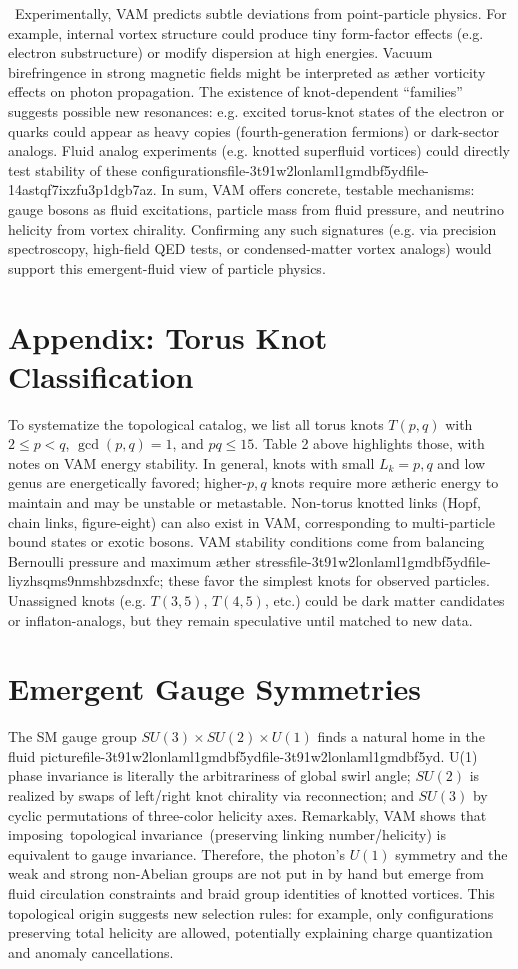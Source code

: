 \documentclass[a4paper,12pt]{article}
\begin{document}
 Experimentally, VAM predicts subtle deviations from point-particle physics. For example, internal vortex structure could produce tiny form-factor effects (e.g. electron substructure) or modify dispersion at high energies. Vacuum birefringence in strong magnetic fields might be interpreted as æther vorticity effects on photon propagation. The existence of knot-dependent “families” suggests possible new resonances: e.g. excited torus-knot states of the electron or quarks could appear as heavy copies (fourth-generation fermions) or dark-sector analogs. Fluid analog experiments (e.g. knotted superfluid vortices) could directly test stability of these configurationsfile-3t91w2lonlaml1gmdbf5ydfile-14astqf7ixzfu3p1dgb7az. In sum, VAM offers concrete, testable mechanisms: gauge bosons as fluid excitations, particle mass from fluid pressure, and neutrino helicity from vortex chirality. Confirming any such signatures (e.g. via precision spectroscopy, high-field QED tests, or condensed-matter vortex analogs) would support this emergent-fluid view of particle physics.

\section*{Appendix: Torus Knot Classification}
To systematize the topological catalog, we list all torus knots $T(p,q)$ with $2\le p<q$, $\gcd(p,q)=1$, and $pq\le15$. Table 2 above highlights those, with notes on VAM energy stability. In general, knots with small $L_k=p,q$ and low genus are energetically favored; higher-$p,q$ knots require more ætheric energy to maintain and may be unstable or metastable. Non-torus knotted links (Hopf, chain links, figure-eight) can also exist in VAM, corresponding to multi-particle bound states or exotic bosons. VAM stability conditions come from balancing Bernoulli pressure and maximum æther stressfile-3t91w2lonlaml1gmdbf5ydfile-liyzhsqms9nmshbzsdnxfc; these favor the simplest knots for observed particles. Unassigned knots (e.g. $T(3,5)$, $T(4,5)$, etc.) could be dark matter candidates or inflaton-analogs, but they remain speculative until matched to new data.

\section*{Emergent Gauge Symmetries}
The SM gauge group $SU(3)\times SU(2)\times U(1)$ finds a natural home in the fluid picturefile-3t91w2lonlaml1gmdbf5ydfile-3t91w2lonlaml1gmdbf5yd. U(1) phase invariance is literally the arbitrariness of global swirl angle; $SU(2)$ is realized by swaps of left/right knot chirality via reconnection; and $SU(3)$ by cyclic permutations of three-color helicity axes. Remarkably, VAM shows that imposing topological invariance (preserving linking number/helicity) is equivalent to gauge invariance. Therefore, the photon’s $U(1)$ symmetry and the weak and strong non-Abelian groups are not put in by hand but emerge from fluid circulation constraints and braid group identities of knotted vortices. This topological origin suggests new selection rules: for example, only configurations preserving total helicity are allowed, potentially explaining charge quantization and anomaly cancellations.
\end{document}
